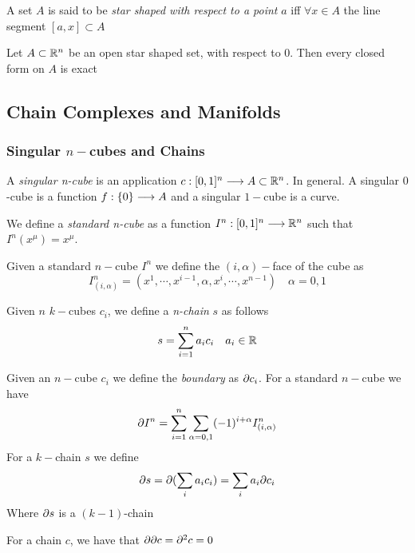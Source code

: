 \documentclass[../complete.tex]{subfiles}
\begin{document}
\begin{dfn}
	A set $A$ is said to be \textit{star shaped with respect to a point} $a$ iff $\forall x\in A$ the line segment $[a,x]\subset A$
\end{dfn}
\begin{lem}[Poincaré's]
	Let $A\subset\mathbb{R}^n$ be an open star shaped set, with respect to 0. Then every closed form on $A$ is exact
\end{lem}
\subsection{Chain Complexes and Manifolds}
\subsubsection{Singular $n-$cubes and Chains}
\begin{dfn}
	A \textit{singular n-cube} is an application $c:[0,1]^n\overset{}{\longrightarrow} A\subset\mathbb{R}^n$. In general. A singular $0$-cube is a function $f:\{0\}\overset{}{\longrightarrow} A$ and a singular $1-$cube is a curve.
\end{dfn}
\begin{dfn}
	We define a \textit{standard n-cube} as a function $I^n:[0,1]^n\overset{}{\longrightarrow}\mathbb{R}^n$ such that $I^n(x^\mu)=x^\mu$.
\end{dfn}
\begin{dfn}[Face]
	Given a standard $n-$cube $I^n$ we define the $(i,\alpha)-$face of the cube as
	\begin{equation}
		I_{(i,\alpha)}^n=(x^1,\cdots,x^{i-1},\alpha,x^i,\cdots,x^{n-1})\quad\alpha=0,1
		\label{eq:iaface}
	\end{equation}
\end{dfn}
\begin{dfn}[Chain]
	Given $n$ $k-$cubes $c_i$, we define a \textit{n-chain} $s$ as follows
	\begin{equation}
		s=\sum_{i=1}^na_ic_i\quad a_i\in\mathbb{R}
		\label{eq:chain}
	\end{equation}
\end{dfn}
\begin{dfn}[Boundary]
	Given an $n-$cube $c_i$ we define the \textit{boundary} as $\partial c_i$. For a standard $n-$cube we have
	\begin{equation}
		\partial I^n=\sum_{i=1}^n\sum_{\alpha=0,1}(-1)^{i+\alpha}I^n_{(i,\alpha)}
		\label{eq:boundarysncube}
	\end{equation}
	For a $k-$chain $s$ we define
	\begin{equation}
		\partial s=\partial(\sum_ia_ic_i)=\sum_ia_i\partial c_i
		\label{eq:chainboundary}
	\end{equation}
	Where $\partial s$ is a $(k-1)$-chain
\end{dfn}
\begin{thm}
	For a chain $c$, we have that $\partial\partial c=\partial^2c=0$
\end{thm}
\end{document}
